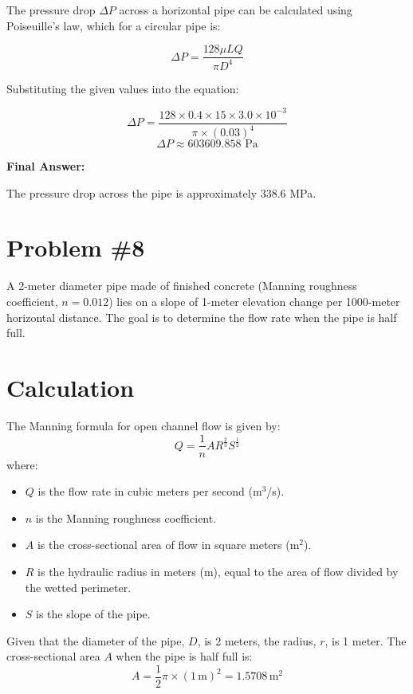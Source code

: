 \documentclass{article}
\begin{document}
The pressure drop \( \Delta P \) across a horizontal pipe can be calculated using Poiseuille's law, which for a circular pipe is:

\[ \Delta P = \frac{128 \mu L Q}{\pi D^4} \]

Substituting the given values into the equation:

\[ \Delta P = \frac{128 \times 0.4 \times 15 \times 3.0 \times 10^{-3}}{\pi \times (0.03)^4} \]
\[ \Delta P \approx 603609.858 \text{ Pa} \]

\textbf{Final Answer:}

The pressure drop across the pipe is approximately \( 338.6 \) MPa.
\newpage



\section*{Problem \#8}
A 2-meter diameter pipe made of finished concrete (Manning roughness coefficient, \( n = 0.012 \)) lies on a slope of 1-meter elevation change per 1000-meter horizontal distance. The goal is to determine the flow rate when the pipe is half full.

\section*{Calculation}
The Manning formula for open channel flow is given by:
\begin{equation}
    Q = \frac{1}{n} A R^{\frac{2}{3}} S^{\frac{1}{2}}
\end{equation}
where:
\begin{itemize}
    \item \( Q \) is the flow rate in cubic meters per second (m\(^3\)/s).
    \item \( n \) is the Manning roughness coefficient.
    \item \( A \) is the cross-sectional area of flow in square meters (m\(^2\)).
    \item \( R \) is the hydraulic radius in meters (m), equal to the area of flow divided by the wetted perimeter.
    \item \( S \) is the slope of the pipe.
\end{itemize}

Given that the diameter of the pipe, \( D \), is 2 meters, the radius, \( r \), is 1 meter. The cross-sectional area \( A \) when the pipe is half full is:
\begin{equation}
    A = \frac{1}{2} \pi \times (1\, \text{m})^2 = 1.5708\, \text{m}^2
\end{equation}
\end{document}
